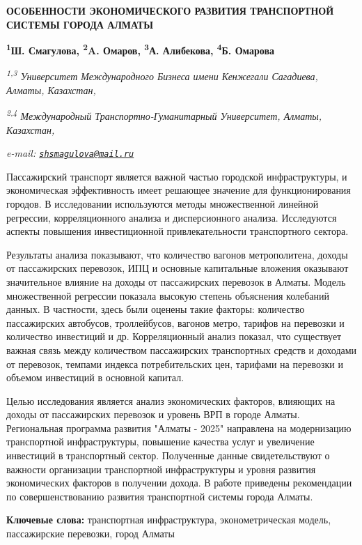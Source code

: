 {\bfseries ОСОБЕННОСТИ ЭКОНОМИЧЕСКОГО РАЗВИТИЯ ТРАНСПОРТНОЙ СИСТЕМЫ ГОРОДА
АЛМАТЫ}

{\bfseries \textsuperscript{1}Ш. Смагулова\textsuperscript{\envelope },
\textsuperscript{2}A. Омаров, \textsuperscript{3}А. Алибекова,
\textsuperscript{4}Б. Омарова}

\emph{\textsuperscript{1,3} Университет Международного Бизнеса имени
Кенжегали Сагадиева, Алматы, Казахстан,}

\emph{\textsuperscript{2,4} Международный Транспортно-Гуманитарный
Университет, Алматы, Казахстан,}

\emph{e-mail:
\href{mailto:shsmagulova@mail.ru}{\nolinkurl{shsmagulova@mail.ru}}}

Пассажирский транспорт является важной частью городской инфраструктуры,
и экономическая эффективность имеет решающее значение для
функционирования городов. В исследовании используются методы
множественной линейной регрессии, корреляционного анализа и
дисперсионного анализа. Исследуются аспекты повышения инвестиционной
привлекательности транспортного сектора.

Результаты анализа показывают, что количество вагонов метрополитена,
доходы от пассажирских перевозок, ИПЦ и основные капитальные вложения
оказывают значительное влияние на доходы от пассажирских перевозок в
Алматы. Модель множественной регрессии показала высокую степень
объяснения колебаний данных. В частности, здесь были оценены такие
факторы: количество пассажирских автобусов, троллейбусов, вагонов метро,
тарифов на перевозки и количество инвестиций и др. Корреляционный анализ
показал, что существует важная связь между количеством пассажирских
транспортных средств и доходами от перевозок, темпами индекса
потребительских цен, тарифами на перевозки и объемом инвестиций в
основной капитал.

Целью исследования является анализ экономических факторов, влияющих на
доходы от пассажирских перевозок и уровень ВРП в городе Алматы.
Региональная программа развития "Алматы - 2025" направлена на
модернизацию транспортной инфраструктуры, повышение качества услуг и
увеличение инвестиций в транспортный сектор. Полученные данные
свидетельствуют о важности организации транспортной инфраструктуры и
уровня развития экономических факторов в получении дохода. В работе
приведены рекомендации по совершенствованию развития транспортной
системы города Алматы.

{\bfseries Ключевые слова:} транспортная инфраструктура, эконометрическая
модель, пассажирские перевозки, город Алматы

